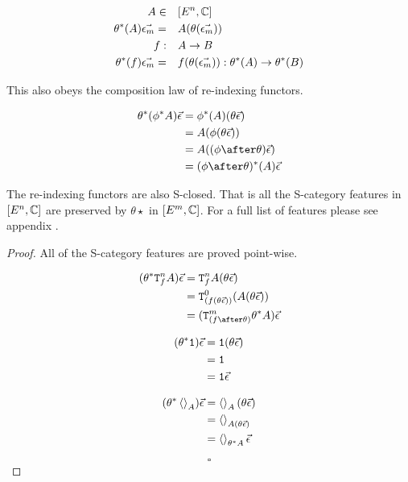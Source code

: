 \documentclass{Report}
\begin{document}
\begin{align}
    A\in&\quad [E^n, \mathbb{C}]\\
    \theta^*(A) \vec{\epsilon_m} =&\quad  A(\theta(\vec{\epsilon_m}))\\
    f:&\quad A \rightarrow B\\
    \theta^*(f) \vec{\epsilon_m} =&\quad f(\theta(\vec{\epsilon_m})): \theta^*(A) \rightarrow \theta^*(B)\\
\end{align}

This also obeys the composition law of re-indexing functors.

\begin{align}
    \theta\star(\phi\star A) \ev & = \phi\star(A)(\theta \ev)\\
    & = A(\phi(\theta\ev))\\
    & = A((\phi\after\theta) \ev)\\
    & = (\phi\after\theta)\star(A) \ev
\end{align}

\begin{theorem}
    The re-indexing functors are also S-closed. That is all the S-category features in $[E^n, \mathbb{C}]$ are preserved by $\theta\star$ in $[E^m, \mathbb{C}]$. For a full list of features please see appendix .
\end{theorem}


\begin{proof}
    All of the S-category features are proved point-wise.

    \begin{align}
        (\theta\star\Tn{f}{A})\ev & = \Tn{f}{A}(\theta\ev) \\
        & = \Tz{(f(\theta\ev))}{(A(\theta\ev))}\\
        & = (\Tm{(f\after\theta)}{\theta\star A})\ev\\
    \end{align}

    
\begin{align}
    (\theta^* \texttt{1})\vec{\epsilon} & = \texttt{1}(\theta\vec{\epsilon})\\
    & = \texttt{1} \\
    & = \texttt{1} \vec{\epsilon}\\
\end{align}

\begin{align}
    (\theta^*\left\langle\right\rangle_{A})\vec{\epsilon} & = \left\langle\right\rangle_{A}(\theta\vec{\epsilon})\\
    & = \left\langle\right\rangle_{A(\theta\vec{\epsilon})}\\
    & = \left\langle\right\rangle_{\theta^* A}\vec{\epsilon}
\end{align}

    $$\square$$
\end{proof}
\end{document}
